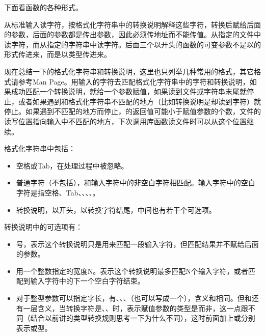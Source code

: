 下面看函数的各种形式。




从标准输入读字符，按格式化字符串中的转换说明解释这些字符，转换后赋给后面的参数，后面的参数都是传出参数，因此必须传地址而不能传值。从指定的文件中读字符，而从指定的字符串中读字符。后面三个以开头的函数的可变参数不是以的形式传进来，而是以类型传进来。



现在总结一下的格式化字符串和转换说明，这里也只列举几种常用的格式，其它格式请参考Man Page。用输入的字符去匹配格式化字符串中的字符和转换说明，如果成功匹配一个转换说明，就给一个参数赋值，如果读到文件或字符串末尾就停止，或者如果遇到和格式化字符串不匹配的地方（比如转换说明是却读到字符）就停止。如果遇到不匹配的地方而停止，的返回值可能小于赋值参数的个数，文件的读写位置指向输入中不匹配的地方，下次调用库函数读文件时可以从这个位置继续。



格式化字符串中包括：


\begin{itemize}

\item 空格或Tab，在处理过程中被忽略。

\item 普通字符（不包括\BookCode{\%}），和输入字符中的非空白字符相匹配。输入字符中的空白字符是指空格、Tab、、、、。

\item 转换说明，以\BookCode{\%}开头，以转换字符结尾，中间也有若干个可选项。
\end{itemize}


转换说明中的可选项有：


\begin{itemize}

\item \BookCode{*}号，表示这个转换说明只是用来匹配一段输入字符，但匹配结果并不赋给后面的参数。

\item 用一个整数指定的宽度N。表示这个转换说明最多匹配N个输入字符，或者匹配到输入字符中的下一个空白字符结束。

\item 对于整型参数可以指定字长，有、、、（也可以写成一个），含义和相同。但和还有一层含义，当转换字符是、、时，表示赋值参数的类型是而非，这一点跟不同（结合以前讲的类型转换规则思考一下为什么不同），这时前面加上或分别表示或型。
\end{itemize}


